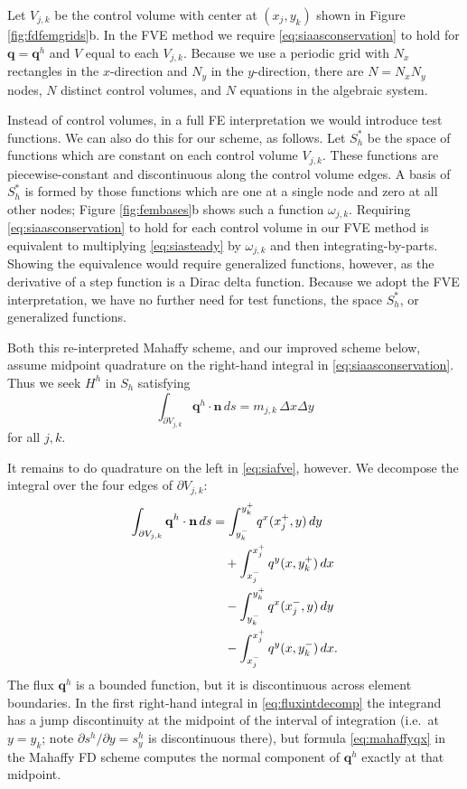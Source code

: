 \documentclass[review,letterpaper]{igs}
\newcommand\bn{\mathbf{n}}
\newcommand\bq{\mathbf{q}}
\begin{document}
Let $V_{j,k}$ be the control volume with center at $(x_j,y_k)$ shown in Figure \ref{fig:fdfemgrids}b.  In the FVE method we require \eqref{eq:siaasconservation} to hold for $\bq=\bq^h$ and $V$ equal to each $V_{j,k}$.  Because we use a periodic grid with $N_x$ rectangles in the $x$-direction and $N_y$ in the $y$-direction, there are $N=N_xN_y$ nodes, $N$ distinct control volumes, and $N$ equations in the algebraic system.

Instead of control volumes, in a full FE interpretation we would introduce test functions.  We can also do this for our scheme, as follows.  Let $S_h^*$ be the space of functions which are constant on each control volume $V_{j,k}$.  These functions are piecewise-constant and discontinuous along the control volume edges.  A basis of $S_h^*$ is formed by those functions which are one at a single node and zero at all other nodes; Figure \ref{fig:fembases}b shows such a function $\omega_{j,k}$.  Requiring \eqref{eq:siaasconservation} to hold for each control volume in our FVE method is equivalent to multiplying \eqref{eq:siasteady} by $\omega_{j,k}$ and then integrating-by-parts.  Showing the equivalence would require generalized functions, however, as the derivative of a step function is a Dirac delta function.  Because we adopt the FVE interpretation, we have no further need for test functions, the space $S_h^*$, or generalized functions.

Both this re-interpreted Mahaffy scheme, and our improved scheme below, assume midpoint quadrature on the right-hand integral in \eqref{eq:siaasconservation}.  Thus we seek $H^h$ in $S_h$ satisfying
\begin{equation}
  \int_{\partial V_{j,k}} \bq^h \cdot \bn\,ds = m_{j,k}\, \Delta x \Delta y \label{eq:siafve}
\end{equation}
for all $j,k$.

It remains to do quadrature on the left in \eqref{eq:siafve}, however.  We decompose the integral over the four edges of $\partial V_{j,k}$:
\begin{align}
\int_{\partial V_{j,k}} \bq^h \cdot \bn\,ds &= \int_{y_k^-}^{y_k^+} q^x(x_j^+,y)\,dy \label{eq:fluxintdecomp} \\
&\quad + \int_{x_j^-}^{x_j^+} q^y(x,y_k^+)\,dx \notag \\
&\quad - \int_{y_k^-}^{y_k^+} q^x(x_j^-,y)\,dy \notag \\
&\quad - \int_{x_j^-}^{x_j^+} q^y(x,y_k^-)\,dx. \notag
\end{align}
The flux $\bq^h$ is a bounded function, but it is discontinuous across element boundaries.  In the first right-hand integral in \eqref{eq:fluxintdecomp} the integrand has a jump discontinuity at the midpoint of the interval of integration (i.e.~at $y=y_k$; note $\partial s^h/\partial y = s^h_y$ is discontinuous there), but formula \eqref{eq:mahaffyqx} in the Mahaffy FD scheme computes the normal component of $\bq^h$ exactly at that midpoint.
\end{document}
